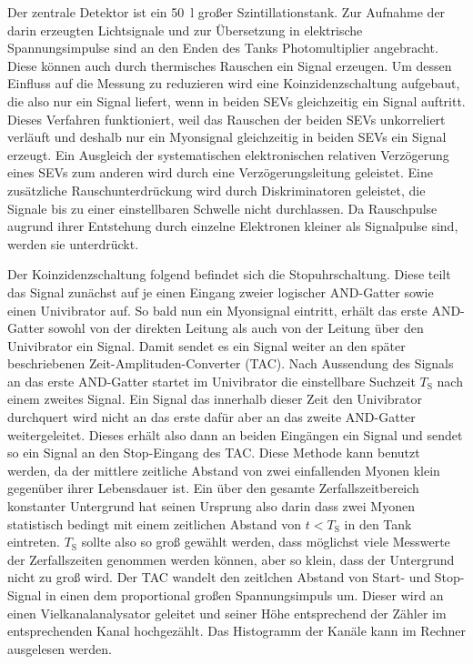 Der zentrale Detektor ist ein \SI{50}{\litre} großer Szintillationstank. Zur Aufnahme der darin erzeugten Lichtsignale und zur Übersetzung in elektrische Spannungsimpulse sind an den Enden des Tanks Photomultiplier angebracht. Diese können auch durch thermisches Rauschen ein Signal erzeugen. Um dessen Einfluss auf die Messung zu reduzieren wird eine Koinzidenzschaltung aufgebaut, die also nur ein Signal liefert, wenn in beiden SEVs gleichzeitig ein Signal auftritt. Dieses Verfahren funktioniert, weil das Rauschen der beiden SEVs unkorreliert verläuft und deshalb nur ein Myonsignal gleichzeitig in beiden SEVs ein Signal erzeugt. Ein Ausgleich der systematischen elektronischen relativen Verzögerung eines SEVs zum anderen wird durch eine Verzögerungsleitung geleistet. Eine zusätzliche Rauschunterdrückung wird durch Diskriminatoren geleistet, die Signale bis zu einer einstellbaren Schwelle nicht durchlassen. Da Rauschpulse augrund ihrer Entstehung durch einzelne Elektronen kleiner als Signalpulse sind, werden sie unterdrückt.

Der Koinzidenzschaltung folgend befindet sich die Stopuhrschaltung. Diese teilt das Signal zunächst auf je einen Eingang zweier logischer AND-Gatter sowie einen Univibrator auf. So bald nun ein Myonsignal eintritt, erhält das erste AND-Gatter sowohl von der direkten Leitung als auch von der Leitung über den Univibrator ein Signal. Damit sendet es ein Signal weiter an den später beschriebenen Zeit-Amplituden-Converter (TAC). Nach Aussendung des Signals an das erste AND-Gatter startet im Univibrator die einstellbare Suchzeit $T_\text{S}$ nach einem zweites Signal. Ein Signal das innerhalb dieser Zeit den Univibrator durchquert wird nicht an das erste dafür aber an das zweite AND-Gatter weitergeleitet. Dieses erhält also dann an beiden Eingängen ein Signal und sendet so ein Signal an den Stop-Eingang des TAC. Diese Methode kann benutzt werden, da der mittlere zeitliche Abstand von zwei einfallenden Myonen klein gegenüber ihrer Lebensdauer ist. Ein über den gesamte Zerfallszeitbereich konstanter Untergrund hat seinen Ursprung also darin dass zwei Myonen statistisch bedingt mit einem zeitlichen Abstand von $t<T_\text{S}$ in den Tank eintreten. $T_\text{S}$ sollte also so groß gewählt werden, dass möglichst viele Messwerte der Zerfallszeiten genommen werden können, aber so klein, dass der Untergrund nicht zu groß wird.
Der TAC wandelt den zeitlchen Abstand von Start- und Stop-Signal in einen dem proportional großen Spannungsimpuls um. Dieser wird an einen Vielkanalanalysator geleitet und seiner Höhe entsprechend der Zähler im entsprechenden Kanal hochgezählt. Das Histogramm der Kanäle kann im Rechner ausgelesen werden.

